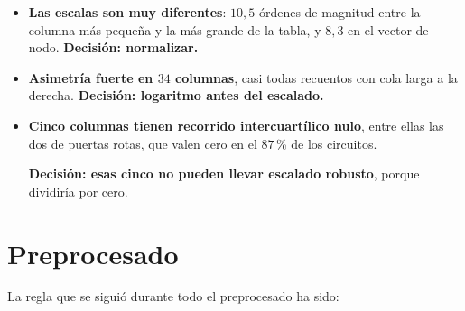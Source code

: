 \begin{itemize}
    \item \textbf{Las escalas son muy diferentes}: $10{,}5$ órdenes de magnitud entre la
          columna más pequeña y la más grande de la tabla, y $8{,}3$ en el vector de nodo.
          \textbf{Decisión: normalizar.}
    \item \textbf{Asimetría fuerte en $34$ columnas}, casi todas recuentos con cola larga a la
          derecha. \textbf{Decisión: logaritmo antes del escalado.}
    \item \textbf{Cinco columnas tienen recorrido intercuartílico nulo}, entre ellas las dos de
          puertas rotas, que valen cero en el $87$\,\% de los circuitos. 
          
          \textbf{Decisión: esas
          cinco no pueden llevar escalado robusto}, porque dividiría por cero.
\end{itemize}



\section{Preprocesado}
\label{sec:prep}

La regla que se siguió durante todo el preprocesado ha sido:

\begin{center}
\end{center}

